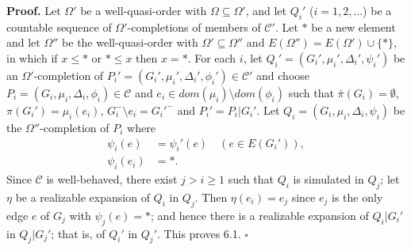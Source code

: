 \textbf{Proof.} Let $\Omega'$ be a well-quasi-order with $\Omega \subseteq \Omega'$, and let $Q_i'$ ($i = 1, 2, \dots$) be a countable sequence of $\Omega'$-completions of members of $\mathscr{C}'$. Let $*$ be a new element and let $\Omega''$ be the well-quasi-order with $\Omega' \subseteq \Omega''$ and $E(\Omega'') = E(\Omega') \cup \{*\}$, in which if $x \le *$ or $* \le x$ then $x = *$. For each $i$, let $Q_i' = (G_i', \mu_i', \Delta_i', \psi_i')$ be an $\Omega'$-completion of $P_i' = (G_i', \mu_i', \Delta_i', \phi_i') \in \mathscr{C}'$ and choose $P_i = (G_i, \mu_i, \Delta_i, \phi_i) \in \mathscr{C}$ and $e_i \in dom(\mu_i) \setminus dom(\phi_i)$ such that $\bar{\pi}(G_i) = \emptyset$, $\pi(G_i') = \mu_i(e_i)$, $G_i^- \setminus e_i = G_i'^-$ and $P_i' = P_i|G_i'$. Let $Q_i = (G_i, \mu_i, \Delta_i, \psi_i)$ be the $\Omega''$-completion of $P_i$ where
\begin{align*}
\psi_i(e) &= \psi_i'(e) \quad (e \in E(G_i')), \\
\psi_i(e_i) &= *.
\end{align*}
Since $\mathscr{C}$ is well-behaved, there exist $j > i \ge 1$ such that $Q_i$ is simulated in $Q_j$; let $\eta$ be a realizable expansion of $Q_i$ in $Q_j$. Then $\eta(e_i) = e_j$ since $e_j$ is the only edge $e$ of $G_j$ with $\psi_j(e) = *$; and hence there is a realizable expansion of $Q_i|G_i'$ in $Q_j|G_j'$; that is, of $Q_i'$ in $Q_j'$. This proves 6.1. $\square$
